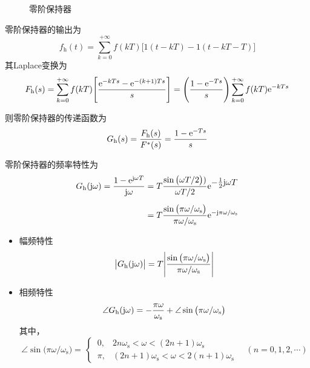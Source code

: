 \begin{figure}[!htb]
	\centering
	\caption{零阶保持器}
	\label{零阶保持器}
\end{figure}
零阶保持器的输出为
\begin{equation}
	f_\text{h}(t) = \sum_{k = 0}^{+\infty} f(kT)\big[1(t- kT) - 1(t - kT - T)\big]
\end{equation}
其Laplace变换为
\begin{equation}
	F_\text{h}(s) = \sum_{k = 0}^{+ \infty}f(kT)\Bigg[\dfrac{{\rm{e}}^{-kTs} - {\rm{e}}^{-(k+1)Ts}}{s}\Bigg] = \Bigg(\dfrac{1 - {\rm{e}}^{- Ts}}{s}\Bigg) \sum_{k = 0}^{+\infty}f(kT){\rm{e}}^{-kTs}
\end{equation}

则零阶保持器的传递函数为
\begin{equation}
	G_\text{h}(s) = \dfrac{F_{\text{h}}(s)}{F^*(s)} = \dfrac{1 - {\rm{e}}^{-Ts}}{s}
\end{equation}

\noindent 零阶保持器的频率特性为
\begin{align}
	G_\text{h} (\text{j} \omega) = \dfrac{1 - {\rm{e}}^{\text{j} \omega T}}{\text{j} \omega} &= T \dfrac{\sin \big(\omega T / 2\big))}{\omega T /2} {\rm{e}}^{\textstyle -\frac{1}{2} \text{j} \omega T} \notag \\[0.5em]
	&= T \dfrac{\sin \big(\pi \omega / \omega_\text{s}\big)}{\pi \omega / \omega_\text{s}}{\rm{e}}^{- \text{j} \pi\omega /\omega_\text{s}}
\end{align}
\begin{itemize}
	\item 幅频特性
	\begin{equation}
		\big|G_\text{h}(\text{j} \omega)\big| = T \Bigg|\dfrac{\sin \big(\pi \omega / \omega_\text{s}\big)}{\pi \omega / \omega_\text{s}}\Bigg|
	\end{equation}
	\item 相频特性
	\begin{equation}
		\angle G_\text{h}(\text{j} \omega) = - \dfrac{\pi \omega}{\omega_\text{s}} + \angle \sin \big(\pi \omega / \omega_\text{s}\big)
	\end{equation}
	其中，
	\begin{equation}
		\angle \sin \big(\pi \omega / \omega_\text{s}\big) =
		\, \begin{cases}
			\,0, & 2n\omega_\text{s}<\omega < (2n+1)\omega_\text{s}\\[0.5em]
			\, \pi, & (2n+1)\omega_\text{s} < \omega < 2(n+1)\omega_\text{s}
		\end{cases}
		\quad (n = 0,1,2,\cdots)
	\end{equation}
\end{itemize}

